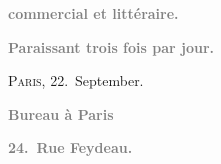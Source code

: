 \pstart
           \begin{otherlanguage}{french}\textcolor{gray}{\textbf{commercial et littéraire.}}\end{otherlanguage}\pend
           
\pstart
           \begin{otherlanguage}{french}\textcolor{gray}{\textbf{\textbf{Paraissant trois fois par jour.}}}\end{otherlanguage}\hfill \textsc{Paris}, 22. September.\pend
           
\pstart
           \begin{otherlanguage}{french}\textcolor{gray}{\textbf{\textbf{Bureau à Paris}}}\end{otherlanguage}\pend
           
\pstart
           \begin{otherlanguage}{french}\textcolor{gray}{\textbf{\textbf{24. Rue Feydeau.}}}\end{otherlanguage}\pend
           

